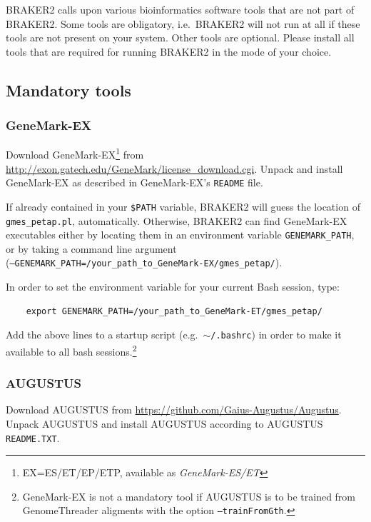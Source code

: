 \documentclass[a4paper,10pt]{report}
\begin{document}
BRAKER2 calls upon various bioinformatics software tools that are not part of BRAKER2. Some tools are obligatory, i.e.~BRAKER2 will not run at all if these tools are not present on your system. Other tools are optional. Please install all tools that are required for running BRAKER2 in the mode of your choice.

\subsection{Mandatory tools}

\subsubsection{GeneMark-EX}

Download GeneMark-EX\footnote{EX=ES/ET/EP/ETP, available as \textit{GeneMark-ES/ET}} from \url{http://exon.gatech.edu/GeneMark/license_download.cgi}.
 Unpack and install GeneMark-EX as described in GeneMark-EX's \texttt{README} file.

If already contained in your \texttt{\$PATH} variable, BRAKER2 will guess the location of \texttt{gmes\_petap.pl}, automatically. Otherwise, BRAKER2 can find GeneMark-EX executables either by locating them in an environment variable \texttt{GENEMARK\_PATH}, or by taking a command line argument\\ (\texttt{--GENEMARK\_PATH=/your\_path\_to\_GeneMark-EX/gmes\_petap/}). 

In order to set the environment variable for your current Bash session, type: 

    \begin{verbatim}
    export GENEMARK_PATH=/your_path_to_GeneMark-ET/gmes_petap/
\end{verbatim}

Add the above lines to a startup script (e.g.~\texttt{$\sim$/.bashrc}) in order to make it available to all bash sessions.\footnote{GeneMark-EX is not a mandatory tool if AUGUSTUS is to be trained from GenomeThreader aligments with the option \texttt{--trainFromGth}.}


\subsubsection{AUGUSTUS}

Download AUGUSTUS from \url{https://github.com/Gaius-Augustus/Augustus}.
 Unpack AUGUSTUS and install AUGUSTUS  according to AUGUSTUS \texttt{README.TXT}. 
 
\end{document}
